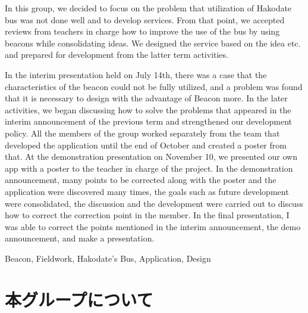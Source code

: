 \documentclass[openany,11pt,papersize]{jsbook}
\begin{document}
\begin{eabstract}

 

In this group, we decided to focus on the problem that utilization of Hakodate bus was not done well and to develop services.
From that point, we accepted reviews from teachers in charge how to improve the use of the bus by using beacons while consolidating ideas.
We designed the service based on the idea etc. and prepared for development from the latter term activities.

In the interim presentation held on July 14th, there was a case that the characteristics of the beacon could not be fully utilized, and a problem was found that it is necessary to design with the advantage of Beacon more.
In the later activities, we began discussing how to solve the problems that appeared in the interim announcement of the previous term and strengthened our development policy.
All the members of the group worked separately from the team that developed the application until the end of October and created a poster from that.
At the demonstration presentation on November 10, we presented our own app with a poster to the teacher in charge of the project.
In the demonstration announcement, many points to be corrected along with the poster and the application were discovered many times, the goals such as future development were consolidated, the discussion and the development were carried out to discuss how to correct the correction point in the member.
In the final presentation, I was able to correct the points mentioned in the interim announcement, the demo announcement, and make a presentation.

\begin{ekeyword}
Beacon, Fieldwork, Hakodate's Bus, Application, Design
\end{ekeyword}
\end{eabstract}


  \tableofcontents%


  \mainmatter%

  




  \chapter{本グループについて}
\end{document}
